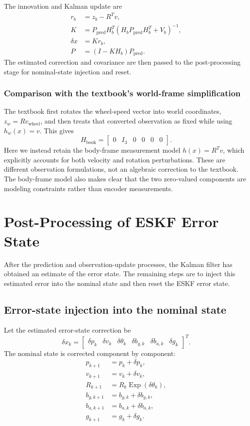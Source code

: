 \documentclass[11pt]{article}
\numberwithin{equation}{section}
\newcommand{\Exp}{\operatorname{Exp}}
\begin{document}
The innovation and Kalman update are
\begin{align}
 r_b&=z_b-R^Tv,\\
 K&=P_{\mathrm{pred}}H_b^T
 (H_bP_{\mathrm{pred}}H_b^T+V_b)^{-1},\\
 \delta x&=Kr_b,\\
 P&=(I-KH_b)P_{\mathrm{pred}}.
\end{align}
The estimated correction and covariance are then passed to the
post-processing stage for nominal-state injection and reset.

\subsubsection*{Comparison with the textbook's world-frame simplification}

The textbook first rotates the wheel-speed vector into world coordinates,
$z_w=Rv_{\mathrm{wheel}}$, and then treats that converted observation as
fixed while using $h_w(x)=v$. This gives
\[
 H_{\mathrm{book}}=\begin{bmatrix}0&I_3&0&0&0&0\end{bmatrix}.
\]
Here we instead retain the body-frame measurement model $h(x)=R^Tv$,
which explicitly accounts for both velocity and rotation perturbations.
These are different observation formulations, not an algebraic correction
to the textbook. The body-frame model also makes clear that the two
zero-valued components are modeling constraints rather than encoder
measurements.

\section{Post-Processing of ESKF Error State}

After the prediction and observation-update processes, the Kalman
filter has obtained an estimate of the error state.  The remaining
steps are to inject this estimated error into the nominal state and
then reset the ESKF error state.

\subsection{Error-state injection into the nominal state}

Let the estimated error-state correction be
\[
\delta x_k
=
\begin{bmatrix}
\delta p_k&
\delta v_k&
\delta\theta_k&
\delta b_{g,k}&
\delta b_{a,k}&
\delta g_k
\end{bmatrix}^{T}.
\]
The nominal state is corrected component by component:
\begin{equation}
\boxed{
\begin{aligned}
p_{k+1} &= p_k+\delta p_k,\\
v_{k+1} &= v_k+\delta v_k,\\
R_{k+1} &= R_k\Exp(\delta\theta_k),\\
b_{g,k+1} &= b_{g,k}+\delta b_{g,k},\\
b_{a,k+1} &= b_{a,k}+\delta b_{a,k},\\
g_{k+1} &= g_k+\delta g_k.
\end{aligned}
}
\end{equation}
\end{document}
